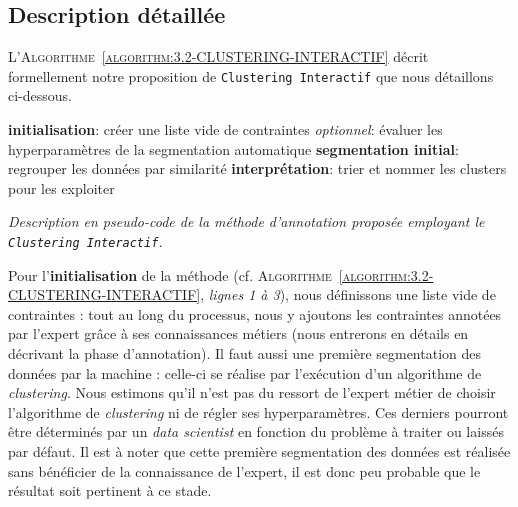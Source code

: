 	
	\subsection{Description détaillée}
	\label{section:3.2.2-DESCRIPTION-THEORIQUE-DETAILLEE}
	
		L'\textsc{Algorithme~\ref{algorithm:3.2-CLUSTERING-INTERACTIF}} décrit formellement notre proposition de \texttt{Clustering Interactif} que nous détaillons ci-dessous.
		\begin{algorithm}
			\textbf{initialisation}: créer une liste vide de contraintes \;
			\textit{optionnel}: évaluer les hyperparamètres de la segmentation automatique \;
			\textbf{segmentation initial}: regrouper les données par similarité \;
			\textbf{interprétation}: trier et nommer les clusters pour les exploiter \;
			\caption{\textit{
				Description en pseudo-code de la méthode d'annotation proposée employant le \texttt{Clustering Interactif}.
			}}
			\label{algorithm:3.2-CLUSTERING-INTERACTIF}
		\end{algorithm}
		
		Pour l'\textbf{initialisation} de la méthode (cf. \textsc{Algorithme~\ref{algorithm:3.2-CLUSTERING-INTERACTIF}}, \textit{lignes 1 à 3}), nous définissons une liste vide de contraintes : tout au long du processus, nous y ajoutons les contraintes annotées par l'expert grâce à ses connaissances métiers (nous entrerons en détails en décrivant la phase d'annotation).
		Il faut aussi une première segmentation des données par la machine : celle-ci se réalise par l'exécution d'un algorithme de \textit{clustering}.
		Nous estimons qu'il n'est pas du ressort de l'expert métier de choisir l'algorithme de \textit{clustering} ni de régler ses hyperparamètres.
		Ces derniers pourront être déterminés par un \textit{data scientist} en fonction du problème à traiter ou laissés par défaut.
		Il est à noter que cette première segmentation des données est réalisée sans bénéficier de la connaissance de l'expert, il est donc peu probable que le résultat soit pertinent à ce stade.
		
